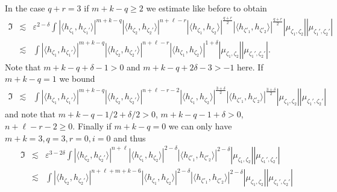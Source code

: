 \documentclass[a4paper,11pt]{article}
\begin{document}
In the case $q + r = 3$ if $m + k - q \geqslant 2$ we estimate like before to
obtain
\begin{eqnarray}
  \mathfrak{I} & \lesssim & \varepsilon^{2 - \delta} \int | \langle
  h_{\zeta_1}, h_{\zeta_1'} \rangle |^{m + k - q} | \langle h_{\zeta_2},
  h_{\zeta_2'} \rangle |^{n + \ell - r} | \langle h_{\zeta_1}, h_{\zeta_2}
  \rangle |^{\frac{q + r}{2}} | \langle h_{\zeta'_1}, h_{\zeta'_2} \rangle
  |^{\frac{q + r}{2}} | \mu_{\zeta_1, \zeta_2} | | \mu_{\zeta_1', \zeta_2'} |
  \nonumber\\
  & \lesssim & \int | \langle h_{\zeta_1}, h_{\zeta_1'} \rangle |^{m + k - q}
  | \langle h_{\zeta_2}, h_{\zeta_2'} \rangle |^{n + \ell - r} | \langle
  h_{\zeta_1}, h_{\zeta_2} \rangle |^{1 + \delta} | \mu_{\zeta_1, \zeta_2} | |
  \mu_{\zeta_1', \zeta_2'} | .  \label{e:graph-est-2}
\end{eqnarray}
Note that $m + k - q + \delta - 1 > 0$ and $m + k - q + 2 \delta - 3 > - 1$
here. If $m + k - q = 1$ we bound
\begin{eqnarray}
  \mathfrak{I} & \lesssim & \int | \langle h_{\zeta_1}, h_{\zeta_1'} \rangle
  |^{m + k - q} | \langle h_{\zeta_2}, h_{\zeta_2'} \rangle |^{n + \ell - r -
  2} | \langle h_{\zeta_1}, h_{\zeta_2} \rangle |^{\frac{3 + \delta}{2}} |
  \langle h_{\zeta'_1}, h_{\zeta'_2} \rangle |^{\frac{3 + \delta}{2}} |
  \mu_{\zeta_1, \zeta_2} | | \mu_{\zeta_1', \zeta_2'} |  \label{e:graph-est-3}
\end{eqnarray}
and note that $m + k - q - 1 / 2 + \delta / 2 > 0$, $m + k - q - 1 + \delta >
0$, $n + \ell - r - 2 \geqslant 0$. Finally if $m + k - q = 0$ we can only
have $m + k = 3, q = 3, r = 0, i = 0$ and thus
\begin{eqnarray}
  \mathfrak{I} & \lesssim & \varepsilon^{3 - 2 \delta} \int | \langle
  h_{\zeta_2}, h_{\zeta_2'} \rangle |^{n + \ell} | \langle h_{\zeta_1},
  h_{\zeta_2} \rangle |^{2 - \delta} | \langle h_{\zeta'_1}, h_{\zeta'_2}
  \rangle |^{2 - \delta} | \mu_{\zeta_1, \zeta_2} | | \mu_{\zeta_1', \zeta_2'}
  | \nonumber\\
  & \lesssim & \int | \langle h_{\zeta_2}, h_{\zeta_2'} \rangle |^{n + \ell +
  m + k - 6} | \langle h_{\zeta_1}, h_{\zeta_2} \rangle |^{2 - \delta} |
  \langle h_{\zeta'_1}, h_{\zeta'_2} \rangle |^{2 - \delta} | \mu_{\zeta_1,
  \zeta_2} | | \mu_{\zeta_1', \zeta_2'} |  \label{e:graph-est-4}
\end{eqnarray}
\end{document}
